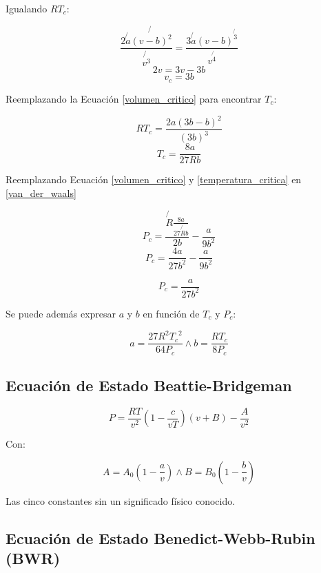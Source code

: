     Igualando \(RT_{c}\):
    
    \[\frac{2\not{a}\not{(v-b)^{2}}}{\not{v^{3}}}=\frac{3\not{a}(v-b)^{\not{3}}}{v^{\not{4}}}\]
    \[2v = 3v - 3b\]
    \begin{equation}
    \label{volumen_critico}
        v_{c} = 3b
    \end{equation}
    
    Reemplazando la Ecuación \ref{volumen_critico} para encontrar \(T_{c}\):
    
    \[RT_{c}=\frac{2a(3b-b)^{2}}{(3b)^{3}}\]
    \begin{equation}
    \label{temperatura_critica}
        T_{c} = \frac{8a}{27Rb}
    \end{equation}
    
    Reemplazando Ecuación \ref{volumen_critico} y \ref{temperatura_critica} en \ref{van_der_waals}
    
    \[P_{c}=\frac{\not{R}\frac{8a}{27\not{R}b}}{2b}-\frac{a}{9b^{2}}\]
    \[P_{c}=\frac{4a}{27b^{2}}-\frac{a}{9b^{2}}\]
    
    \begin{equation}
    \label{presion_critica}
        P_{c}=\frac{a}{27b^{2}}
    \end{equation}
    
    Se puede además expresar \(a\) y \(b\) en función de \(T_{c}\) y \(P_{c}\):
    
    \begin{equation}
        a=\frac{27R^{2}{T_{c}}^{2}}{64P_{c}}\wedge b=\frac{RT_{c}}{8P_{c}}
    \end{equation}
    
    \subsection{Ecuación de Estado Beattie-Bridgeman}
    
    \begin{equation}
        P = \frac{RT}{v^{2}} \left ( 1 - \frac{c}{vT} \right )(v+B)-\frac{A}{v^{2}}
    \end{equation}
    
    Con:
    
    \[A=A_{0}\left ( 1-\frac{a}{v}\right ) \wedge B=B_{0}\left ( 1-\frac{b}{v}\right )\]
    
    Las cinco constantes sin un significado físico conocido.
    
    \subsection{Ecuación de Estado Benedict-Webb-Rubin (BWR)}
    
